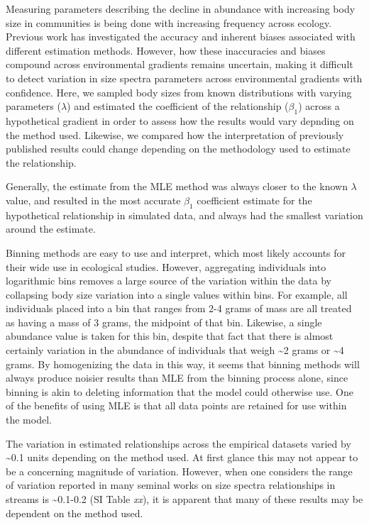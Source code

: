\documentclass[
]{article}
\begin{document}
Measuring parameters describing the decline in abundance with increasing
body size in communities is being done with increasing frequency across
ecology. Previous work has investigated the accuracy and inherent biases
associated with different estimation methods. However, how these
inaccuracies and biases compound across environmental gradients remains
uncertain, making it difficult to detect variation in size spectra
parameters across environmental gradients with confidence. Here, we
sampled body sizes from known distributions with varying parameters
(\(\lambda\)) and estimated the coefficient of the relationship
(\(\beta_1\)) across a hypothetical gradient in order to assess how the
results would vary depnding on the method used. Likewise, we compared
how the interpretation of previously published results could change
depending on the methodology used to estimate the relationship.

Generally, the estimate from the MLE method was always closer to the
known \(\lambda\) value, and resulted in the most accurate \(\beta_1\)
coefficient estimate for the hypothetical relationship in simulated
data, and always had the smallest variation around the estimate.

Binning methods are easy to use and interpret, which most likely
accounts for their wide use in ecological studies. However, aggregating
individuals into logarithmic bins removes a large source of the
variation within the data by collapsing body size variation into a
single values within bins. For example, all individuals placed into a
bin that ranges from 2-4 grams of mass are all treated as having a mass
of 3 grams, the midpoint of that bin. Likewise, a single abundance value
is taken for this bin, despite that fact that there is almost certainly
variation in the abundance of individuals that weigh \textasciitilde2
grams or \textasciitilde4 grams. By homogenizing the data in this way,
it seems that binning methods will always produce noisier results than
MLE from the binning process alone, since binning is akin to deleting
information that the model could otherwise use. One of the benefits of
using MLE is that all data points are retained for use within the model.

The variation in estimated relationships across the empirical datasets
varied by \textasciitilde0.1 units depending on the method used. At
first glance this may not appear to be a concerning magnitude of
variation. However, when one considers the range of variation reported
in many seminal works on size spectra relationships in streams is
\textasciitilde0.1-0.2 (SI Table \emph{xx}), it is apparent that many of
these results may be dependent on the method used.
\end{document}
